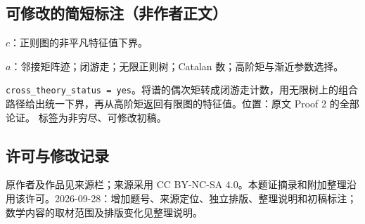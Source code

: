 \documentclass[UTF8,11pt]{ctexart}
\theoremstyle{definition}
\begin{document}
\subsection*{可修改的简短标注（非作者正文）}
$c$：正则图的非平凡特征值下界。

$a$：邻接矩阵迹；闭游走；无限正则树；Catalan 数；高阶矩与渐近参数选择。

\texttt{cross\_theory\_status = yes}。将谱的偶次矩转成闭游走计数，用无限树上的组合路径给出统一下界，再从高阶矩返回有限图的特征值。位置：原文 Proof 2 的全部论证。
标签为非穷尽、可修改初稿。
\subsection*{许可与修改记录}
原作者及作品见来源栏；来源采用 CC BY-NC-SA 4.0。本题证摘录和附加整理沿用该许可。2026-09-28：增加题号、来源定位、独立排版、整理说明和初稿标注；数学内容的取材范围及排版变化见整理说明。
\end{document}
